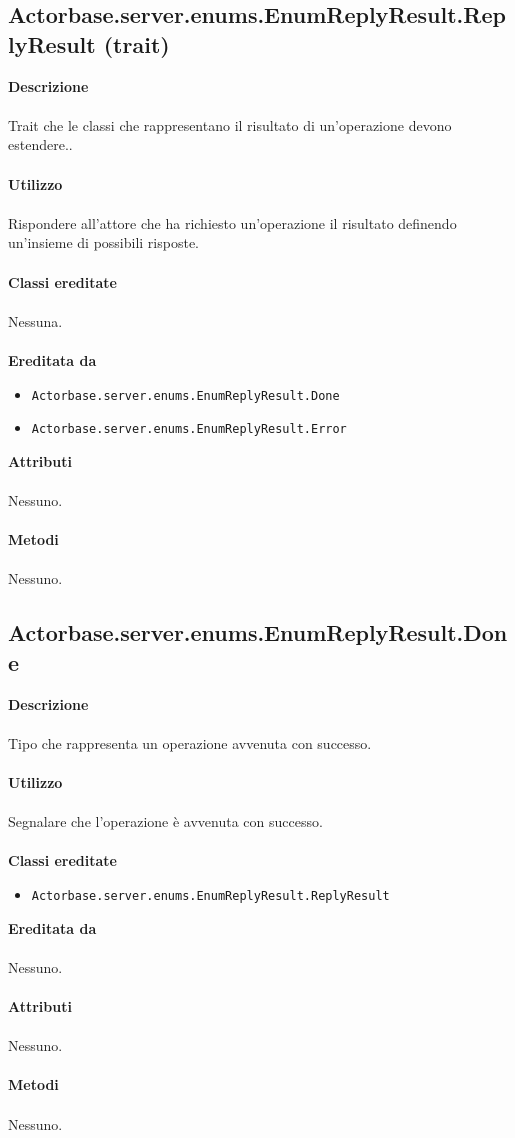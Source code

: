 \documentclass[a4paper]{article}
\begin{document}
				\subsection{Actorbase.server.enums.EnumReplyResult.ReplyResult (trait)}
		\textbf{Descrizione}
			\\ \\
			Trait che le classi che rappresentano il risultato di un'operazione devono estendere..
			\\ \\
		\textbf{Utilizzo}
			\\ \\
			Rispondere all'attore che ha richiesto un'operazione il risultato definendo un'insieme di possibili risposte.
			\\ \\
		\textbf{Classi ereditate}
		\\ \\
		Nessuna.
		\\ \\
		\textbf{Ereditata da}
			\begin{itemize}
				\item \texttt{Actorbase.server.enums.EnumReplyResult.Done}
				\item \texttt{Actorbase.server.enums.EnumReplyResult.Error}
			\end{itemize}
		\textbf{Attributi}
		\\ \\
			Nessuno.
		\\ \\
		\textbf{Metodi}
			\\ \\
			Nessuno.
		
			
	\subsection{Actorbase.server.enums.EnumReplyResult.Done}
		\textbf{Descrizione}
			\\ \\
				Tipo che rappresenta un operazione avvenuta con successo.
			\\ \\
		\textbf{Utilizzo}
			\\ \\
				Segnalare che l'operazione è avvenuta con successo.
			\\ \\
		\textbf{Classi ereditate}
			\begin{itemize}
				\item \texttt{Actorbase.server.enums.EnumReplyResult.ReplyResult}
			\end{itemize}
		\textbf{Ereditata da}
		\\ \\
		Nessuno.
		\\ \\
		\textbf{Attributi}
		\\ \\
		Nessuno.
		\\ \\
		\textbf{Metodi}
			\\ \\
			Nessuno.
			
\end{document}
